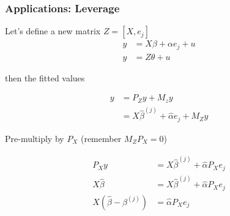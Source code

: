 \documentclass[
  shownotes,
  xcolor={svgnames},
  hyperref={colorlinks,citecolor=DarkBlue,linkcolor=DarkRed,urlcolor=DarkBlue}
  , aspectratio=169]{beamer}
\begin{document}
\begin{frame}
\frametitle{Applications: Leverage}
Let's define a new matrix $Z=[X,e_j]$
\begin{align}
y &= X\beta+\alpha e_j +u \\
y &= Z\theta +u
\end{align}

then the fitted values 

\begin{align}
y &= P_Z y + M_zy  \\
&= X\hat \beta^{(j)} + \hat \alpha e_j + M_Z y
\end{align}

Pre-multiply by $P_X$ (remember $M_Z P_X=0$) 

\begin{align}
P_X y &= X\hat \beta^{(j)} + \hat \alpha P_X e_j \\
X \hat \beta  &= X\hat \beta^{(j)} + \hat \alpha P_X e_j \\
X (\hat \beta  -  \beta^{(j)} )&= \hat \alpha P_X e_j 
\end{align}
\end{frame}
\end{document}
